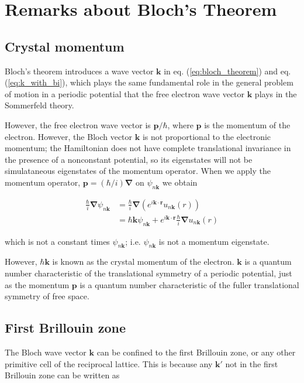 \section{Remarks about Bloch's Theorem}
	\subsection{Crystal momentum}
		Bloch's theorem introduces a wave vector $\mathbf{k}$ in eq. (\ref{eq:bloch_theorem}) and eq. (\ref{eq:k_with_bi}), which plays the same fundamental role in the general problem of motion in a periodic potential that the free electron wave vector $\mathbf{k}$ plays in the Sommerfeld theory. 

		However, the free electron wave vector is $\mathbf{p}/\hbar$, where $\mathbf{p}$ is the momentum of the electron. However, the Bloch vector $\mathbf{k}$ is not proportional to the electronic momentum; the Hamiltonian does not have complete translational invariance in the presence of a nonconstant potential, so its eigenstates will not be simulataneous eigenstates of the momentum operator.  When we apply the momentum operator, $\mathbf{p}=(\hbar/i)\boldsymbol{\nabla}$ on $\psi_{n\mathbf{k}}$ we obtain

		\begin{align} \label{momentum}
			\frac{\hbar}{i}\boldsymbol{\nabla}
			\psi_{n\mathbf{k}}
			&= \frac{\hbar}{i}\boldsymbol{\nabla}
			\left(
			e^{i\mathbf{k \cdot r}}
			u_{n\mathbf{k}}(r)
			\right) \\
			&= \hbar \mathbf{k} \psi_{n\mathbf{k}}
			+ e^{i\mathbf{k \cdot r}}
			\frac{\hbar}{i} \boldsymbol{\nabla}
			u_{n\mathbf{k}} (r)
		\end{align}

		which is not a constant times $\psi_{n\mathbf{k}}$; i.e. $\psi_{n\mathbf{k}}$ is not a momentum eigenstate. 

		However, $\hbar \mathbf{k}$ is known as the crystal momentum  of the electron. $\mathbf{k}$ is a quantum number characteristic of the translational symmetry of a periodic potential, just as the momentum $\mathbf{p}$ is a quantum number characteristic of the fuller translational symmetry of free space. 

	\subsection{First Brillouin zone}
		The Bloch wave vector $\mathbf{k}$ can be confined to the first Brillouin zone, or any other primitive cell of the reciprocal lattice. This is because any $\mathbf{k'}$ not in the first Brillouin zone can be written as

